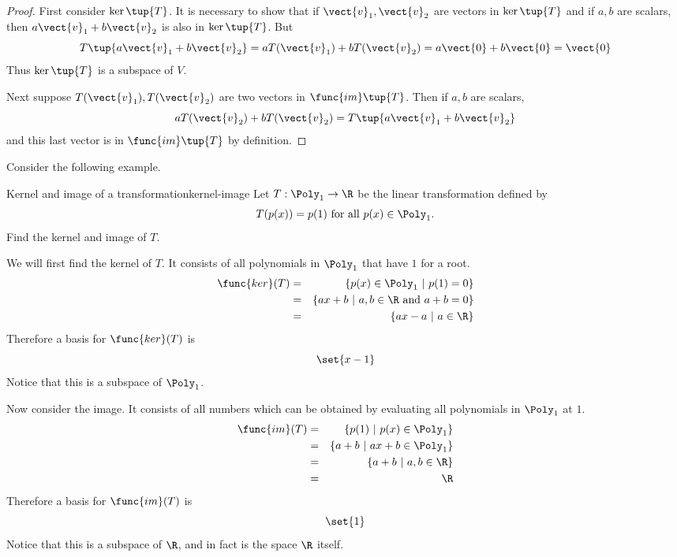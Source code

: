 \begin{proof}
First consider $\ker \tup{T}$. It is necessary to
show that if $\vect{v}_{1},\vect{v}_{2}$ are vectors in $\ker \tup{T} $
and if $a,b$ are scalars, then $a\vect{v}_{1}+b\vect{v}_{2}$ is also in $\ker
\tup{T}$. But 
\begin{equation*}
T\tup{a\vect{v}_{1}+b\vect{v}_{2}} =aT(\vect{v}_{1})+bT(\vect{v}_{2})=a\vect{0}+b\vect{0}=\vect{0}
\end{equation*}
Thus $\ker \tup{T} $ is a subspace of $V$.

Next suppose $T(\vect{v}_{1}),T(\vect{v}_{2})$ are two vectors in $\func{im}\tup{
T}$. Then if $a,b$ are scalars, 
\begin{equation*}
aT(\vect{v}_{2})+bT(\vect{v}_{2})=T\tup{a\vect{v}_{1}+b\vect{v}_{2}}
\end{equation*}
and this last vector is in $\func{im}\tup{T} $ by definition. 
\end{proof}

Consider the following example.

\begin{example}{Kernel and image of a transformation}{kernel-image}
Let $T:\Poly_1\to\R$ be the linear transformation defined by
\[ T(p(x))=p(1)\mbox{ for all } p(x)\in \Poly_1.\]
Find the kernel and image of $T$.
\end{example}

\begin{solution}
We will first find the kernel of $T$. It consists of all polynomials in $\Poly_1$ that have $1$ for a root. 
\begin{eqnarray*}
\func{ker}(T) & = & \{p(x)\in \Poly_1 ~|~ p(1)=0\} \\
& = & \{ax+b ~|~ a,b\in\R \mbox{ and }a+b=0\} \\
& = & \{ax-a ~|~ a\in\R\}
\end{eqnarray*}
Therefore a basis for $\func{ker}(T)$ is 
\[
\set{x-1 }
\]
Notice that this is a subspace of $\Poly_1$. 

Now consider the image. It consists of all numbers which can be obtained by evaluating all polynomials in $\Poly_1$ at $1$. 
\begin{eqnarray*}
\func{im}(T) & = & \{p(1) ~|~ p(x)\in \Poly_1\} \\
 & = & \{a+b ~|~ ax+b\in \Poly_1\} \\
 & = & \{a+b ~|~ a,b\in\R\}\\
 & = & \R
\end{eqnarray*}
Therefore a basis for $\func{im}(T)$ is 
\[
\set{1 }
\]
Notice that this is a subspace of $\R$, and in fact is the space $\R$ itself. 
\end{solution}

